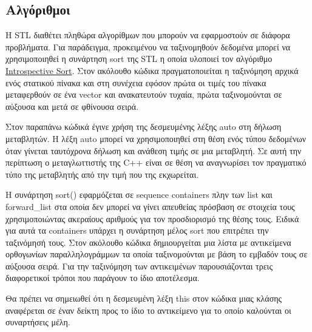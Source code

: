 




\subsection{Αλγόριθμοι}
H STL διαθέτει πληθώρα αλγορίθμων που μπορούν να εφαρμοστούν σε διάφορα προβλήματα. Για παράδειγμα, προκειμένου να ταξινομηθούν δεδομένα μπορεί να χρησιμοποιηθεί η συνάρτηση sort της STL η οποία υλοποιεί τον αλγόριθμο \href{https://xlinux.nist.gov/dads/HTML/introspectiveSort.html}{Introspective Sort}. Στον ακόλουθο κώδικα πραγματοποιείται η ταξινόμηση αρχικά ενός στατικού πίνακα και στη συνέχεια εφόσον πρώτα οι τιμές του πίνακα μεταφερθούν σε ένα vector και ανακατευτούν τυχαία, πρώτα ταξινομούνται σε αύξουσα και μετά σε φθίνουσα σειρά. 





Στον παραπάνω κώδικά έγινε χρήση της δεσμευμένης λέξης auto στη δήλωση μεταβλητών. Η λέξη auto μπορεί να χρησιμοποιηθεί στη θέση ενός τύπου δεδομένων όταν γίνεται ταυτόχρονα δήλωση και ανάθεση τιμής σε μια μεταβλητή. Σε αυτή την περίπτωση ο μεταγλωττιστής της C++ είναι σε θέση να αναγνωρίσει τον πραγματικό τύπο της μεταβλητής από την τιμή που της εκχωρείται. 


Η συνάρτηση sort() εφαρμόζεται σε sequence containers πλην των list και forward\_list στα οποία δεν μπορεί να γίνει απευθείας πρόσβαση σε στοιχεία τους χρησιμοποιώντας ακεραίους αριθμούς για τον προσδιορισμό της θέσης τους. Ειδικά για αυτά τα containers υπάρχει η συνάρτηση μέλος sort που επιτρέπει την ταξινόμησή τους. Στον ακόλουθο κώδικα δημιουργείται μια λίστα με αντικείμενα ορθογωνίων παραλληλογράμμων τα οποία ταξινομούνται με βάση το εμβαδόν τους σε αύξουσα σειρά. Για την ταξινόμηση των αντικειμένων παρουσιάζονται τρεις διαφορετικοί τρόποι που παράγουν το ίδιο αποτέλεσμα.



Θα πρέπει να σημειωθεί ότι η δεσμευμένη λέξη this στον κώδικα μιας κλάσης αναφέρεται σε έναν δείκτη προς το ίδιο το αντικείμενο για το οποίο καλούνται οι συναρτήσεις μέλη.

